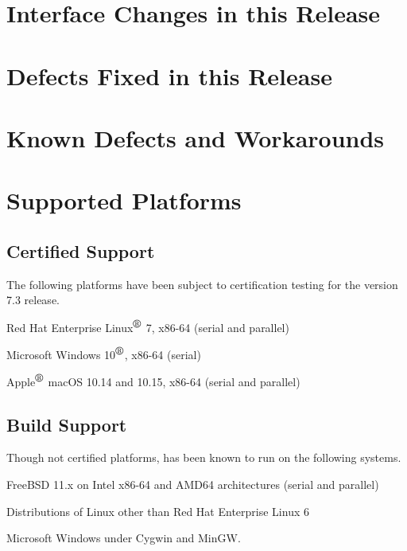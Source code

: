 \documentclass[letterpaper]{scrartcl}
\begin{document}
\newpage
\section{Interface Changes in this Release}


\newpage
\section{Defects Fixed in this Release}


\newpage
\section{Known Defects and Workarounds}


\newpage
\section{Supported Platforms}
\subsection*{Certified Support}
The following platforms have been subject to certification testing for the
\Xyce{} version 7.3 release.
\begin{XyceItemize}
  \item Red Hat Enterprise Linux${}^{\mbox{\textregistered}}$ 7, x86-64 (serial and parallel)
  \item Microsoft Windows 10${}^{\mbox{\textregistered}}$, x86-64 (serial)
  \item Apple${}^{\mbox{\textregistered}}$ macOS 10.14 and 10.15, x86-64 (serial and parallel)
\end{XyceItemize}


\subsection*{Build Support}
Though not certified platforms, \Xyce{} has been known to run on the following
systems.
\begin{XyceItemize}
  \item FreeBSD 11.x on Intel x86-64 and AMD64 architectures (serial
    and parallel)
  \item Distributions of Linux other than Red Hat Enterprise Linux 6
  \item Microsoft Windows under Cygwin and MinGW.
\end{XyceItemize}
\end{document}
